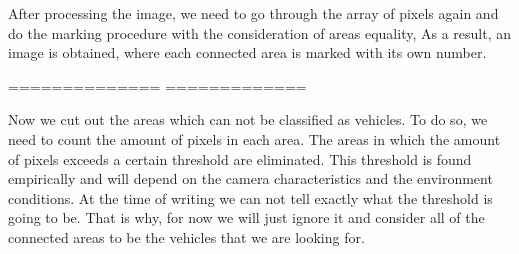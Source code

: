 \documentclass[12pt,a4paper,oneside,titlepage]{article}
\begin{document}
After processing the image, we need to go through the array of pixels again and do the marking procedure with the consideration of areas equality,
As a result, an image is obtained, where each connected area is marked with its own number.



==============
%
%
=============







Now we cut out the areas which can not be classified as vehicles.
To do so, we need to count the amount of pixels in each area. The areas in which the amount of pixels exceeds a certain threshold are eliminated.
This threshold is found empirically and will depend on the camera characteristics and the environment conditions.
At the time of writing we can not tell exactly what the threshold is going to be.
That is why, for now we will just ignore it and consider all of the connected areas to be the vehicles that we are looking for. 
\end{document}
